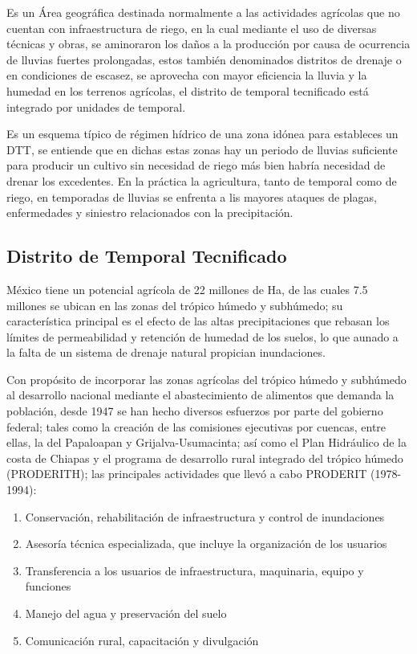 \begin{definition}
    Es un Área geográfica destinada normalmente a las actividades agrícolas que no cuentan con infraestructura de riego, en la cual mediante el uso de diversas técnicas y obras, se aminoraron los daños a la producción por causa de ocurrencia de lluvias fuertes prolongadas, estos también denominados distritos de drenaje o en condiciones de escasez, se aprovecha con mayor eficiencia la lluvia y la humedad en los terrenos agrícolas, el distrito de temporal tecnificado está integrado por unidades de temporal.
\end{definition}
Es un esquema típico de régimen hídrico de una zona idónea para estableces un DTT, se entiende que en dichas estas zonas hay un periodo de lluvias suficiente para producir un cultivo sin necesidad de riego más bien habría necesidad de drenar los excedentes. En la práctica la agricultura, tanto de temporal como de riego, en temporadas de lluvias se enfrenta a lis mayores ataques de plagas, enfermedades y siniestro relacionados con la precipitación.
\subsection{Distrito de Temporal Tecnificado}
México tiene un potencial agrícola de 22 millones de Ha, de las cuales 7.5 millones se ubican en las zonas del trópico húmedo y subhúmedo; su característica principal es el efecto de las altas precipitaciones que rebasan los límites de permeabilidad y retención de humedad de los suelos, lo que aunado a la falta de un sistema de drenaje natural propician inundaciones.

Con propósito de incorporar las zonas agrícolas del trópico húmedo y subhúmedo al desarrollo nacional mediante el abastecimiento de alimentos que demanda la población, desde 1947 se han hecho diversos esfuerzos por parte del gobierno federal; tales como la creación de las comisiones ejecutivas por cuencas, entre ellas, la del Papaloapan y Grijalva-Usumacinta; así como el Plan Hidráulico de la costa de Chiapas y el programa de desarrollo rural integrado del trópico húmedo (PRODERITH); las principales actividades que llevó a cabo PRODERIT (1978-1994):
\begin{enumerate}
    \item Conservación, rehabilitación de infraestructura y control de inundaciones
    \item Asesoría técnica especializada, que incluye la organización de los usuarios
    \item Transferencia a los usuarios de infraestructura, maquinaria, equipo y funciones
    \item Manejo del agua y preservación del suelo
    \item Comunicación rural, capacitación y divulgación
\end{enumerate}

